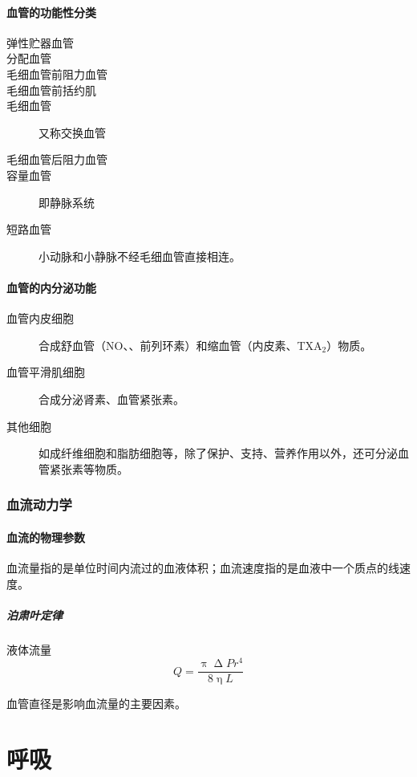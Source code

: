 \paragraph{血管的功能性分类}

\begin{description}
	\item[弹性贮器血管]
	\item[分配血管]
	\item[毛细血管前阻力血管]
	\item[毛细血管前括约肌]
	\item[毛细血管] 又称交换血管
	\item[毛细血管后阻力血管]
	\item[容量血管] 即静脉系统
	\item[短路血管] 小动脉和小静脉不经毛细血管直接相连。
\end{description}

\paragraph{血管的内分泌功能}

\begin{description}
	\item[血管内皮细胞] 合成舒血管（NO、、前列环素）和缩血管（内皮素、TXA$_{2}$）物质。
	\item[血管平滑肌细胞] 合成分泌肾素、血管紧张素。
	\item[其他细胞] 如成纤维细胞和脂肪细胞等，除了保护、支持、营养作用以外，还可分泌血管紧张素等物质。
\end{description}

\subsubsection{血流动力学}

\paragraph{血流的物理参数}

血流量指的是单位时间内流过的血液体积；血流速度指的是血液中一个质点的线速度。

\subparagraph{泊肃叶定律}

液体流量\[Q=\frac{\uppi\upDelta Pr^4}{8\upeta L}\]

血管直径是影响血流量的主要因素。
\section{呼吸}

